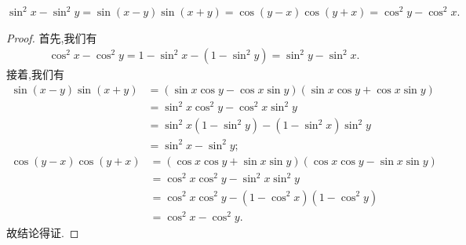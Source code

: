 \documentclass[../../main.tex]{subfiles}%
\begin{document}
\begin{theorem}[三角平方差公式]\label{theorem:三角平方差}
$\sin^2 x-\sin^2 y=\sin(x-y)\sin(x+y)=\cos(y-x)\cos(y+x)=\cos^2 y-\cos^2 x.$
\end{theorem}
\begin{proof}
首先,我们有
\begin{align*}
\cos ^2x-\cos ^2y=1-\sin ^2x-\left( 1-\sin ^2y \right) =\sin ^2y-\sin ^2x.
\end{align*}
接着,我们有
\begin{align*}
\sin(x-y)\sin(x+y) &= (\sin x \cos y - \cos x \sin y)(\sin x \cos y + \cos x \sin y) \\
&= \sin^2 x \cos^2 y - \cos^2 x \sin^2 y \\
&= \sin^2 x (1 - \sin^2 y) - (1 - \sin^2 x) \sin^2 y \\
&= \sin^2 x - \sin^2 y;
\end{align*}
\begin{align*}
\cos(y-x)\cos(y+x) &= (\cos x \cos y + \sin x \sin y)(\cos x \cos y - \sin x \sin y) \\
&= \cos^2 x \cos^2 y - \sin^2 x \sin^2 y \\
&= \cos^2 x \cos^2 y - (1 - \cos^2 x)(1 - \cos^2 y) \\
&= \cos^2 x - \cos^2 y.
\end{align*}
故结论得证.
\end{proof}
\end{document}
